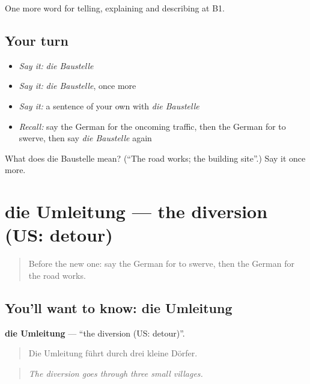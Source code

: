 \begin{grammarlens}[title={What you've built}]
One more word for telling, explaining and describing at B1.
\end{grammarlens}

\subsection*{Your turn}
\begin{itemize}
\raggedright
  \item \emph{Say it:} \emph{die Baustelle}
  \item \emph{Say it:} \emph{die Baustelle}, once more
  \item \emph{Say it:} a sentence of your own with \emph{die Baustelle}
  \item \emph{Recall:} say the German for the oncoming traffic, then the German for to swerve, then say \emph{die Baustelle} again
\end{itemize}

\begin{tcolorbox}[breakable,colback=teal!4,colframe=teal!35!black,title={Before you move on}]
What does die Baustelle mean? (\textquotedblleft{}The road works; the building site\textquotedblright{}.) Say it once more.
\end{tcolorbox}
\section[die Umleitung]{die Umleitung — the diversion (US: detour)}

\label{lesson:GE-C409-umleitung}



\begin{quote}
Before the new one: say the German for to swerve, then the German for the road works.
\end{quote}

\subsection*{You'll want to know: die Umleitung}
\textbf{die Umleitung} — \textquotedblleft{}the diversion (US: detour)\textquotedblright{}.

\begin{quote}
Die Umleitung führt durch drei kleine Dörfer.
\end{quote}

\begin{quote}
\emph{The diversion goes through three small villages.}
\end{quote}

